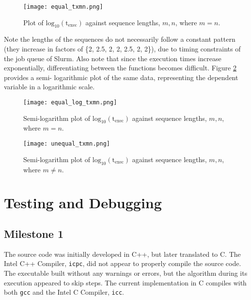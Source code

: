 \documentclass[usletter, 11pt]{extarticle}
\begin{document}
        \begin{figure}[ht]
            \begin{center}
                \texttt{[image: equal\_txmn.png]}
                \caption{Plot of
                $\text{log}_{10}(\text{t}_{\text{exec}})$ against sequence
                lengths, $m,n$, where $m=n$.} \label{equal}
            \end{center}
        \end{figure}

        Note the lengths of the sequences do not necessarily follow a constant
        pattern (they increase in factors of \{2, 2.5, 2, 2, 2.5, 2, 2\}), due
        to timing constraints of the job queue of Slurm. Also note that since
        the execution times increase exponentially, differentiating between the
        functions becomes difficult. Figure \ref{equal_log} provides a semi-
        logarithmic plot of the same data, representing the dependent variable
        in a logarithmic scale.

        \begin{figure}[ht]
            \begin{center}
                \texttt{[image: equal\_log\_txmn.png]}
                \caption{Semi-logarithm plot of
                $\text{log}_{10}(\text{t}_{\text{exec}})$ against sequence
                lengths, $m,n$, where $m=n$.} \label{equal_log}
            \end{center}
        \end{figure}

        \begin{figure}[ht]
            \begin{center}
                \texttt{[image: unequal\_txmn.png]}
                \caption{Semi-logarithm plot of
                $\text{log}_{10}(\text{t}_{\text{exec}})$ against sequence
                lengths, $m,n$, where $m\ne n$. } \label{equal}
            \end{center}
        \end{figure}



    \clearpage
    \newpage
    \section{Testing and Debugging} 

        \subsection{Milestone 1} The source code was initially developed in
        C++, but later translated to C. The Intel C++ Compiler, \texttt{icpc},
        did not appear to properly compile the source code. The executable
        built without any warnings or errors, but the algorithm during its
        execution appeared to skip steps. The current implementation in C
        compiles with both \texttt{gcc} and the Intel C Compiler, \texttt{icc}.
\end{document}
